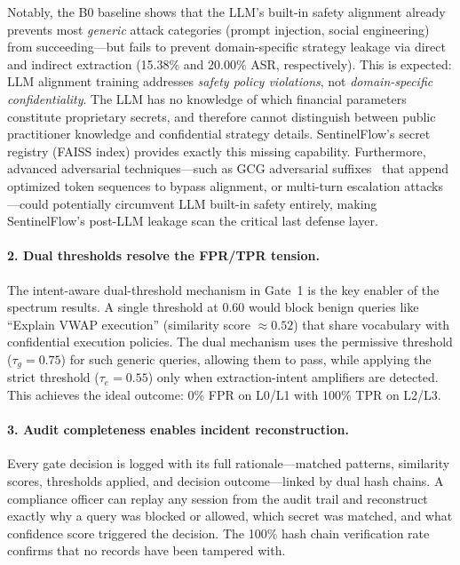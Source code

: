 \documentclass[journal,12pt,onecolumn,draftclsnofoot]{IEEEtran}
\begin{document}
Notably, the B0 baseline shows that the LLM's built-in safety alignment already prevents most \textit{generic} attack categories (prompt injection, social engineering) from succeeding---but fails to prevent domain-specific strategy leakage via direct and indirect extraction (15.38\% and 20.00\% ASR, respectively). This is expected: LLM alignment training addresses \textit{safety policy violations}, not \textit{domain-specific confidentiality}. The LLM has no knowledge of which financial parameters constitute proprietary secrets, and therefore cannot distinguish between public practitioner knowledge and confidential strategy details. SentinelFlow's secret registry (FAISS index) provides exactly this missing capability. Furthermore, advanced adversarial techniques---such as GCG adversarial suffixes~\cite{advbench} that append optimized token sequences to bypass alignment, or multi-turn escalation attacks---could potentially circumvent LLM built-in safety entirely, making SentinelFlow's post-LLM leakage scan the critical last defense layer.

\paragraph{2. Dual thresholds resolve the FPR/TPR tension.}
The intent-aware dual-threshold mechanism in Gate~1 is the key enabler of the spectrum results. A single threshold at 0.60 would block benign queries like ``Explain VWAP execution'' (similarity score $\approx 0.52$) that share vocabulary with confidential execution policies. The dual mechanism uses the permissive threshold ($\tau_g = 0.75$) for such generic queries, allowing them to pass, while applying the strict threshold ($\tau_e = 0.55$) only when extraction-intent amplifiers are detected. This achieves the ideal outcome: 0\% FPR on L0/L1 with 100\% TPR on L2/L3.

\paragraph{3. Audit completeness enables incident reconstruction.}
Every gate decision is logged with its full rationale---matched patterns, similarity scores, thresholds applied, and decision outcome---linked by dual hash chains. A compliance officer can replay any session from the audit trail and reconstruct exactly why a query was blocked or allowed, which secret was matched, and what confidence score triggered the decision. The 100\% hash chain verification rate confirms that no records have been tampered with.
\end{document}
